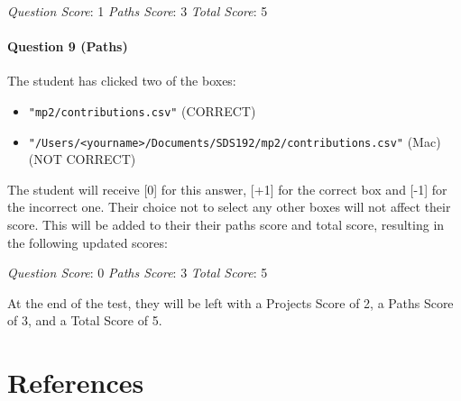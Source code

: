 \documentclass[12pt,twoside]{reedthesis}
\providecommand{\tightlist}{%
  \setlength{\itemsep}{0pt}\setlength{\parskip}{0pt}}
\begin{document}
\emph{Question Score}: 1 \emph{Paths Score}: 3 \emph{Total Score}: 5

\hypertarget{question-9-paths-1}{%
\subsubsection{Question 9 (Paths)}\label{question-9-paths-1}}

The student has clicked two of the boxes:
\begin{itemize}
\tightlist
\item
  \texttt{"mp2/contributions.csv"} (CORRECT)
\item
  \texttt{"/Users/\textless{}yourname\textgreater{}/Documents/SDS192/mp2/contributions.csv"} (Mac) (NOT CORRECT)
\end{itemize}
The student will receive {[}0{]} for this answer, {[}+1{]} for the correct box and {[}-1{]} for the incorrect one. Their choice not to select any other boxes will not affect their score. This will be added to their their paths score and total score, resulting in the following updated scores:

\emph{Question Score}: 0 \emph{Paths Score}: 3 \emph{Total Score}: 5

At the end of the test, they will be left with a Projects Score of 2, a Paths Score of 3, and a Total Score of 5.

\backmatter

\hypertarget{references}{%
\chapter*{References}\label{references}}


\noindent

\setlength{\parindent}{-0.20in}
\setlength{\leftskip}{0.20in}
\setlength{\parskip}{8pt}
\end{document}
